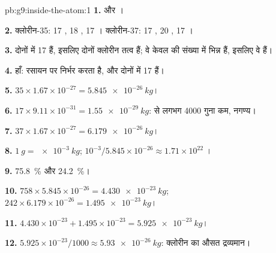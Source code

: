 \begin{solution}{pb:g9:inside-the-atom:1}
\textbf{1.}  और ।

\textbf{2.} क्लोरीन-35: 17 , 18 , 17 ।
क्लोरीन-37: 17 , 20 , 17 ।

\textbf{3.} दोनों में 17  हैं, इसलिए दोनों क्लोरीन तत्व हैं; वे केवल
 की संख्या में भिन्न हैं, इसलिए वे  हैं।

\textbf{4.} हाँ: रसायन  पर निर्भर करता है, और दोनों में 17 हैं।

\textbf{5.} $35 \times 1.67 \times 10^{-27} = \qty{5.845e-26}{kg}$।

\textbf{6.} $17 \times 9.11 \times 10^{-31} = \qty{1.55e-29}{kg}$:
 से लगभग 4000 गुना कम, नगण्य।

\textbf{7.} $37 \times 1.67 \times 10^{-27} = \qty{6.179e-26}{kg}$।

\textbf{8.} $\qty{1}{g} = \qty{e-3}{kg}$; $10^{-3} / 5.845 \times
10^{-26} \approx 1.71 \times 10^{22}$ ।

\textbf{9.} \qty{75.8}{\percent} और \qty{24.2}{\percent}।

\textbf{10.} $758 \times 5.845 \times 10^{-26} = \qty{4.430e-23}{kg}$;
$242 \times 6.179 \times 10^{-26} = \qty{1.495e-23}{kg}$।

\textbf{11.} $4.430 \times 10^{-23} + 1.495 \times 10^{-23} =
\qty{5.925e-23}{kg}$।

\textbf{12.} $5.925 \times 10^{-23} / 1000 \approx
\qty{5.93e-26}{kg}$: क्लोरीन  का औसत द्रव्यमान।
\end{solution}
